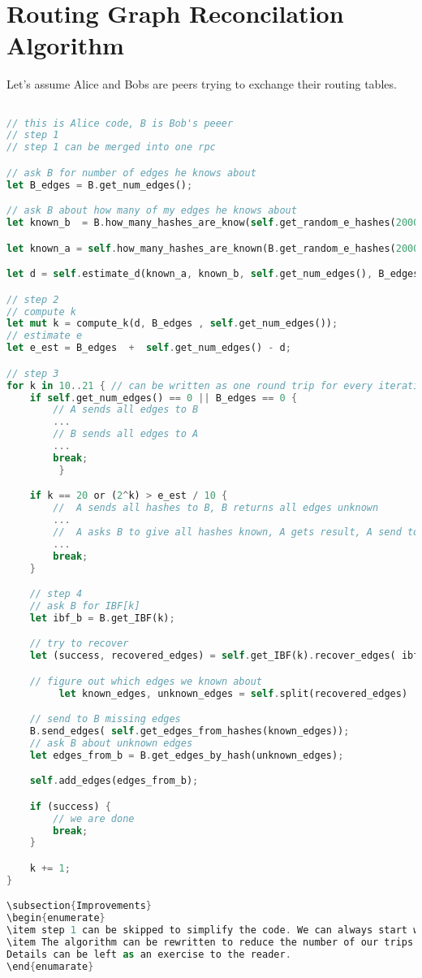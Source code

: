 \documentclass[11pt]{article}
\begin{document}
\section{Routing Graph Reconcilation Algorithm}
Let's assume Alice and Bobs are peers trying to exchange their routing tables.
\begin{lstlisting}[language=Rust]

// this is Alice code, B is Bob's peeer
// step 1
// step 1 can be merged into one rpc

// ask B for number of edges he knows about
let B_edges = B.get_num_edges();

// ask B about how many of my edges he knows about
let known_b  = B.how_many_hashes_are_know(self.get_random_e_hashes(2000));

let known_a = self.how_many_hashes_are_known(B.get_random_e_hashes(2000));

let d = self.estimate_d(known_a, known_b, self.get_num_edges(), B_edges);

// step 2
// compute k
let mut k = compute_k(d, B_edges , self.get_num_edges());
// estimate e
let e_est = B_edges  +  self.get_num_edges() - d;

// step 3
for k in 10..21 { // can be written as one round trip for every iteration
	if self.get_num_edges() == 0 || B_edges == 0 {
		// A sends all edges to B
		...
		// B sends all edges to A
		...
		break;
         }

	if k == 20 or (2^k) > e_est / 10 {
		//  A sends all hashes to B, B returns all edges unknown
		...
		//  A asks B to give all hashes known, A gets result, A send to B all edges it needs
		...
		break;
	}

	// step 4
	// ask B for IBF[k]
	let ibf_b = B.get_IBF(k);

	// try to recover
	let (success, recovered_edges) = self.get_IBF(k).recover_edges( ibf_b);

	// figure out which edges we known about
         let known_edges, unknown_edges = self.split(recovered_edges)

	// send to B missing edges
	B.send_edges( self.get_edges_from_hashes(known_edges));
	// ask B about unknown edges
	let edges_from_b = B.get_edges_by_hash(unknown_edges);

	self.add_edges(edges_from_b);

	if (success) {
		// we are done
		break;
	}

	k += 1;
}

\subsection{Improvements}
\begin{enumerate}
\item step 1 can be skipped to simplify the code. We can always start with k = 10
\item The algorithm can be rewritten to reduce the number of our trips. Each iteration of loop can be made into a half of a round trip.
Details can be left as an exercise to the reader.
\end{enumarate}

\end{lstlisting}
\end{document}
